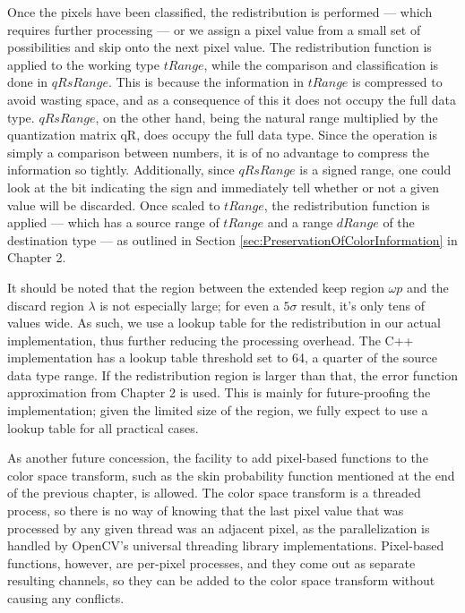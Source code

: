 Once the pixels have been classified, the redistribution is performed --- which requires further processing --- or we assign a pixel value from a small set of possibilities and skip onto the next pixel value. The redistribution function is applied to the working type $tRange$, while the comparison and classification is done in $qRsRange$. This is because the information in $tRange$ is compressed to avoid wasting space, and as a consequence of this it does not occupy the full data type. $qRsRange$, on the other hand, being the natural range multiplied by the quantization matrix qR, does occupy the full data type. Since the operation is simply a comparison between numbers, it is of no advantage to compress the information so tightly. Additionally, since $qRsRange$ is a signed range, one could look at the bit indicating the sign and immediately tell whether or not a given value will be discarded. Once scaled to $tRange$, the redistribution function is applied --- which has a source range of $tRange$ and a range $dRange$ of the destination type --- as outlined in Section \ref{sec:PreservationOfColorInformation} in Chapter 2.

It should be noted that the region between the extended keep region $\omega p$ and the discard region $\lambda$ is not especially large; for even a $5\sigma$ result, it's only tens of values wide. As such, we use a lookup table for the redistribution in our actual implementation, thus further reducing the processing overhead. The C++ implementation has a lookup table threshold set to 64, a quarter of the source data type range. If the redistribution region is larger than that, the error function approximation from Chapter 2 is used. This is mainly for future-proofing the implementation; given the limited size of the region, we fully expect to use a lookup table for all practical cases.

As another future concession, the facility to add pixel-based functions to the color space transform, such as the skin probability function mentioned at the end of the previous chapter, is allowed. The color space transform is a threaded process, so there is no way of knowing that the last pixel value that was processed by any given thread was an adjacent pixel, as the parallelization is handled by OpenCV's universal threading library implementations. Pixel-based functions, however, are per-pixel processes, and they come out as separate resulting channels, so they can be added to the color space transform without causing any conflicts.



